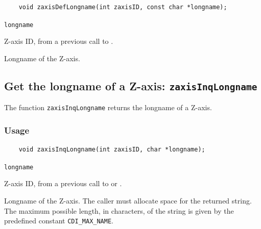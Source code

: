 \begin{verbatim}
    void zaxisDefLongname(int zaxisID, const char *longname);
\end{verbatim}

\hspace*{4mm}\begin{minipage}[]{15cm}
\begin{deflist}{\texttt{longname}\ }
\item[\texttt{zaxisID}]
Z-axis ID, from a previous call to {}.
\item[\texttt{longname}]
Longname of the Z-axis.

\end{deflist}
\end{minipage}


\subsection{Get the longname of a Z-axis: \texttt{zaxisInqLongname}}
\label{zaxisInqLongname}

The function {\texttt{zaxisInqLongname}} returns the longname of a Z-axis.

\subsubsection*{Usage}

\begin{verbatim}
    void zaxisInqLongname(int zaxisID, char *longname);
\end{verbatim}

\hspace*{4mm}\begin{minipage}[]{15cm}
\begin{deflist}{\texttt{longname}\ }
\item[\texttt{zaxisID}]
Z-axis ID, from a previous call to {} or {}.
\item[\texttt{longname}]
Longname of the Z-axis. The caller must allocate space for the
                    returned string. The maximum possible length, in characters, of
                    the string is given by the predefined constant {\texttt{CDI\_MAX\_NAME}}.

\end{deflist}
\end{minipage}

